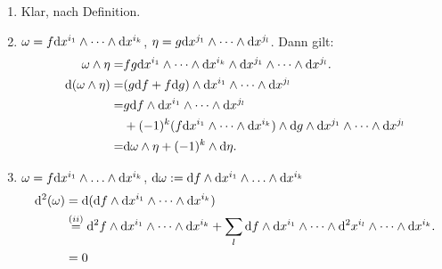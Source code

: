 \begin{bew}
\begin{enumerate}[label=(\roman*),leftmargin=*]
\item
	Klar, nach Definition.
\item
	$\omega = f\mathrm{d} x^{i_1} \wedge \cdots \wedge \mathrm{d} x^{i_k}$, $\eta = g \mathrm{d} x^{j_1} \wedge \cdots \wedge \mathrm{d} x^{j_l}$. Dann gilt:
	\begin{align*}
		\omega \wedge \eta =& fg \mathrm{d} x^{i_1} \wedge \cdots \wedge \mathrm{d} x^{i_k} \wedge \mathrm{d} x^{j_1} \wedge \cdots \wedge \mathrm{d} x^{j_l}.\\
		\mathrm{d} (\omega \wedge \eta) =& (g \mathrm{d} f + f \mathrm{d} g) \wedge \mathrm{d} x^{i_1} \wedge \cdots \wedge \mathrm{d} x^{j_l}\\
		= & g \mathrm{d} f \wedge \mathrm{d} x^{i_1} \wedge \cdots \wedge \mathrm{d} x^{j_l}\\
		& + (-1)^k(f \mathrm{d} x^{i_1} \wedge \cdots \wedge \mathrm{d} x^{i_k}) \wedge \mathrm{d} g \wedge \mathrm{d} x^{j_1} \wedge \cdots \wedge \mathrm{d} x^{j_l}\\
		= & \mathrm{d} \omega \wedge \eta + (-1)^k \wedge \mathrm{d} \eta.
	\end{align*}
\item
	$\omega = f \mathrm{d} x^{i_1} \wedge \ldots  \wedge \mathrm{d} x^{i_k}$, $\mathrm{d} \omega := \mathrm{d} f \wedge \mathrm{d} x^{i_1} \wedge \ldots \wedge \mathrm{d} x^{i_k}$
	\begin{align*}
		\mathrm{d}^2(\omega) & = \mathrm{d}(\mathrm{d} f \wedge \mathrm{d} x^{i_1} \wedge \cdots \wedge \mathrm{d} x^{i_k})\\
		& \overset{(ii)}{=} \mathrm{d}^2f \wedge \mathrm{d} x^{i_1} \wedge \cdots \wedge \mathrm{d} x^{i_k} + \sum_l \mathrm{d} f \wedge \mathrm{d} x^{i_1} \wedge \cdots \wedge \mathrm{d}^2x^{i_l} \wedge \cdots \wedge \mathrm{d} x^{i_k}.\\
		& = 0
	\end{align*}
\end{enumerate}\end{bew}

